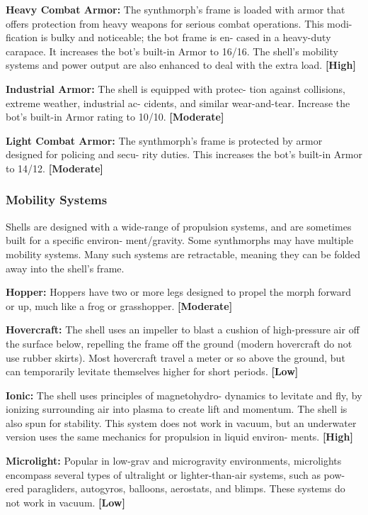 \textbf{Heavy Combat Armor:} The synthmorph's frame is 
loaded with armor that offers protection from heavy 
weapons for serious combat operations. This modi-
fication is bulky and noticeable; the bot frame is en-
cased in a heavy-duty carapace. It increases the bot's 
built-in Armor to 16/16. The shell's mobility systems 
and power output are also enhanced to deal with the 
extra load. \textbf{[High]}

\textbf{Industrial Armor:} The shell is equipped with protec-
tion against collisions, extreme weather, industrial ac-
cidents, and similar wear-and-tear. Increase the bot's 
built-in Armor rating to 10/10. \textbf{[Moderate]}

\textbf{Light Combat Armor:} The synthmorph's frame is 
protected by armor designed for policing and secu-
rity duties. This increases the bot's built-in Armor to 
14/12. \textbf{[Moderate]}

\subsubsection{Mobility Systems}

Shells are designed with a wide-range of propulsion 
systems, and are sometimes built for a specific environ-
ment/gravity. Some synthmorphs may have multiple 
mobility systems. Many such systems are retractable, 
meaning they can be folded away into the shell's frame.

\textbf{Hopper:} Hoppers have two or more legs designed 
to propel the morph forward or up, much like a frog 
or grasshopper. \textbf{[Moderate]}

\textbf{Hovercraft:} The shell uses an impeller to blast a 
cushion of high-pressure air off the surface below, 
repelling the frame off the ground (modern hovercraft 
do not use rubber skirts). Most hovercraft travel a 
meter or so above the ground, but can temporarily 
levitate themselves higher for short periods. \textbf{[Low]}

\textbf{Ionic:} The shell uses principles of magnetohydro-
dynamics to levitate and fly, by ionizing surrounding 
air into plasma to create lift and momentum. The 
shell is also spun for stability. This system does not 
work in vacuum, but an underwater version uses the 
same mechanics for propulsion in liquid environ-
ments. \textbf{[High]}

\textbf{Microlight:} Popular in low-grav and microgravity 
environments, microlights encompass several types 
of ultralight or lighter-than-air systems, such as pow-
ered paragliders, autogyros, balloons, aerostats, and 
blimps. These systems do not work in vacuum. \textbf{[Low]}

